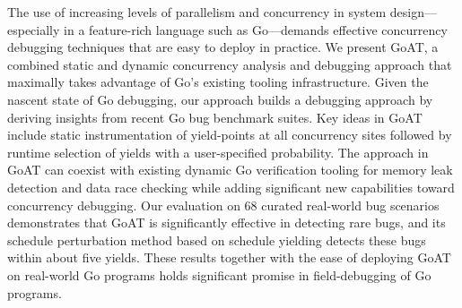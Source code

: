 The use of increasing levels of parallelism and concurrency in system
design---especially in a feature-rich language such as Go---demands
effective concurrency debugging techniques that are easy to deploy in practice.
%
We present GoAT, a combined static and dynamic concurrency analysis
and debugging approach
that maximally takes advantage of Go's existing tooling infrastructure.
%
Given the nascent state of Go debugging, our approach builds
a debugging approach by deriving insights from recent Go bug benchmark
suites.
%
Key ideas in GoAT include static instrumentation of yield-points
at all concurrency sites followed by runtime selection of yields with
a user-specified probability.
%
The approach in GoAT can coexist with existing dynamic Go verification tooling
for memory leak detection and data race checking while adding significant
new capabilities toward concurrency debugging.
%
Our evaluation on 68 curated real-world bug scenarios
demonstrates that GoAT is significantly effective in detecting
rare bugs, and its schedule perturbation method based on schedule
yielding detects these bugs within about five yields.
%
These results together with the ease of deploying GoAT on real-world
Go programs holds significant promise in field-debugging of Go programs.
